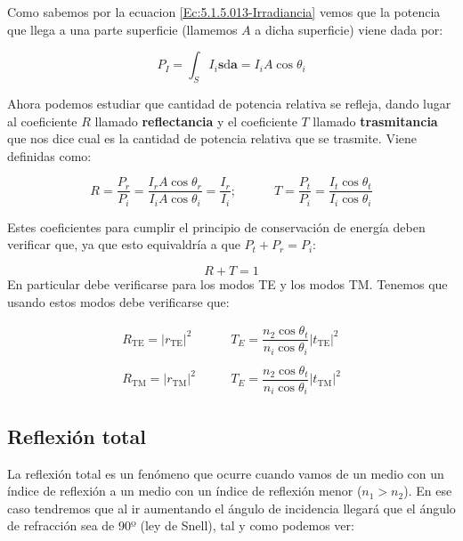 \documentclass[12pt,a4paper]{article}
\newcommand{\D}{\mathrm{d}}
\newcommand{\tquad}{\quad \quad \quad}
\newcommand{\TE}{\mathrm{TE}}
\newcommand{\TM}{\mathrm{TM}}
\newcommand{\an}{\mathbf{a}}
\newcommand{\sn}{\mathbf{s}}
\numberwithin{equation}{section}
\numberwithin{figure}{section}
\begin{document}
Como sabemos por la ecuacion \ref{Ec:5.1.5.013-Irradiancia} vemos que la potencia que llega a una parte superficie (llamemos $A$ a dicha superficie) viene dada por:

\begin{equation}
P_I = \int_S I_i \sn \D \an = I_i A \cos \theta_i
\end{equation}

Ahora podemos estudiar que cantidad de potencia relativa se refleja, dando lugar al coeficiente $R$ llamado \textbf{reflectancia} y el coeficiente $T$ llamado \textbf{trasmitancia} que nos dice cual es la cantidad de potencia relativa que se trasmite. Viene definidas como:

\begin{equation}
R = \dfrac{P_r}{P_i} = \dfrac{I_r A \cos \theta_r}{I_i A \cos \theta_i} = \dfrac{I_r}{I_i}; \tquad T = \dfrac{P_t}{P_i} = \dfrac{I_t \cos \theta_t}{I_i \cos \theta_i}
\end{equation}

Estes coeficientes para cumplir el principio de conservación de energía deben verificar que, ya que esto equivaldría a que $P_t+P_r=P_i$:

\begin{equation}
R+T =1
\end{equation}
En particular debe verificarse para los modos TE y los modos TM. Tenemos que usando estos modos debe verificarse que:

\begin{equation}
\begin{array}{ll}
R_{\TE} = |r_{\TE}|^2 \quad & \quad T_E = \dfrac{n_2 \cos \theta_t}{n_i \cos \theta_i} |t_{\TE}|^2 \\ \\
R_{\TM} = |r_{\TM}|^2 \quad & \quad T_E = \dfrac{n_2 \cos \theta_t}{n_i \cos \theta_i} |t_{\TM}|^2
\end{array}
\end{equation}

\subsection{Reflexión total}

La reflexión total es un fenómeno que ocurre cuando vamos de un medio con un índice de reflexión a un medio con un índice de reflexión menor ($n_1>n_2$). En ese caso tendremos que al ir aumentando el ángulo de incidencia llegará que el ángulo de refracción sea de 90º (ley de Snell), tal y como podemos ver:
\end{document}
